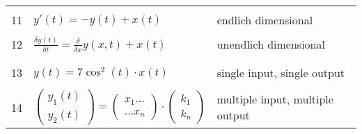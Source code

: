 \begin{table}[h!]
\begin{tabular}{c l l}
		&& \\ 11 	
			& $y'(t) = -y(t) + x(t)$
			& endlich dimensional  \\ 
		&& \\ 12
			& $\frac{\delta y(t)}{\delta t} 
				= \frac{\delta}{\delta x}y(x,t)+x(t)$
			& unendlich dimensional \\ && \\ \hline
		&& \\ 13
			& $y(t) = 7\cos^2(t) \cdot x(t)$
			& single input, single output\\
		&& \\ 14
			& $\begin{pmatrix} y_1(t) \\ y_2(t) \end{pmatrix}
				= \begin{pmatrix} x_1 \dots \\
					\dots x_n \end{pmatrix}
				\cdot
				\begin{pmatrix} k_1 \\ k_n \end{pmatrix}$
			& multiple input, multiple output\\
	\end{tabular}
\end{table}
